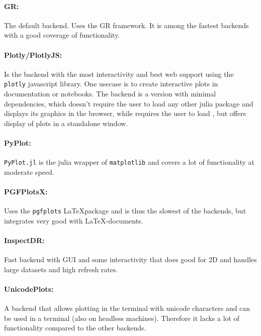 \documentclass[a4paper]{article}
\begin{document}
\paragraph{GR:} The default backend.
Uses the GR framework\cite{heinenGRFrameworkGR}.
It is among the fastest backends with a good coverage of functionality.

\paragraph{Plotly/PlotlyJS:} Is the backend with the most interactivity and best web support using the \texttt{plotly} javascript library\cite{PlotlyJavaScriptGraphing}.
One usecase is to create interactive plots in documentation\cite{PlottingSpectralDistances} or notebooks.
The  backend is a version with minimal dependencies, which doesn't require the user to load any other julia package and displays its graphics in the browser, while  requires the user to load , but offers display of plots in a standalone window.

\paragraph{PyPlot:} \texttt{PyPlot.jl} is the julia wrapper of \texttt{matplotlib}\cite{Hunter:2007} and covers a lot of functionality at moderate speed.

\paragraph{PGFPlotsX:} Uses the \texttt{pgfplots} \LaTeX package\cite{PGFPlotsLaTeXPackage} and is thus the slowest of the backends, but integrates very good with \LaTeX-documents.

\paragraph{InspectDR:} Fast backend with GUI and some interactivity that does good for 2D and handles large datasets and high refresh rates\cite{ma-laforgeInspectDRJlFast2022}.

\paragraph{UnicodePlots:} A backend that allows plotting in the terminal with unicode characters and can be used in a terminal (also on headless machines)\cite{UnicodePlots2022}.
Therefore it lacks a lot of functionality compared to the other backends.
\end{document}
